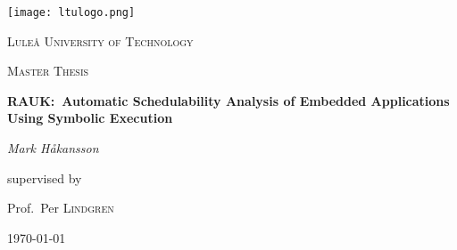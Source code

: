 \begin{titlepage}
    \centering
    \texttt{[image: ltulogo.png]}\par\vspace{1cm}
    {\scshape\LARGE Luleå University of Technology\par}
    \vspace{1cm}
    {\scshape\Large Master Thesis\par}
    \vspace{1.5cm}
    {\huge\bfseries RAUK:\ Automatic Schedulability Analysis of Embedded Applications Using Symbolic Execution\par}
    \vspace{2cm}
    {\Large\textit{Mark Håkansson}\par}
    \vfill
    supervised by\par
    Prof.~Per \textsc{Lindgren}
    \vfill
    {\large \today\par}
\end{titlepage}
